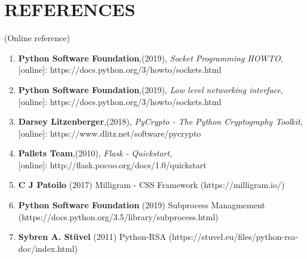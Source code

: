 \chapter*{\rm \large \bf REFERENCES}
\vspace{4.0mm}
\setlength{\parindent}{1cm} 

\scriptsize{(Online reference)}
\begin{enumerate}
    \item \textbf{Python Software Foundation},(2019),
        \textit{Socket Programming HOWTO},\\
        \hspace{15mm}[online]: https://docs.python.org/3/howto/sockets.html

    \item \textbf{Python Software Foundation},(2019),
        \textit{Low level networking interface},\\
        \hspace{15mm}[online]: https://docs.python.org/3/howto/sockets.html

    \item \textbf{Darsey Litzenberger},(2018),
        \textit{PyCrypto - The Python Cryptography Toolkit},\\
        \hspace{15mm}[online]: https://www.dlitz.net/software/pycrypto

    \item \textbf{Pallets Team},(2010),
        \textit{Flask - Quickstart},\\
        \hspace{15mm}[online]: http://flask.pocoo.org/docs/1.0/quickstart

    \item \textbf{C J Patoilo} (2017) Milligram - CSS Framework
        (https://milligram.io/)

    \item \textbf{Python Software Foundation} (2019) Subprocess Managmement
        (https://docs.python.org/3.5/library/subprocess.html)

    \item \textbf{Sybren A. Stüvel} (2011) Python-RSA
        (https://stuvel.eu/files/python-rsa-doc/index.html)
\end{enumerate}


